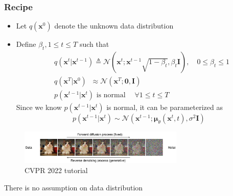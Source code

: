 \documentclass[10pt,xcolor={usenames,dvipsnames,table}]{beamer}
\begin{document}
\begin{frame}
    \frametitle{Recipe}
    \begin{itemize}
        \item Let $q(\bm{x}^{0})$ denote the unknown data distribution
        \item Define $\beta_t, 1\leq t \leq T$ such that
            \begin{align}
                &q(\bm{x}^{t}|\bm{x}^{t-1}) \triangleq \mathcal{N}(\bm{x}^{t}; \bm{x}^{t-1}\sqrt{1-\beta_t}, \beta_t \bm{I}), \quad 0\leq \beta_t \leq 1 \\
                &q(\bm{x}^{T} | \bm{x}^{0}) \; \; \approx \mathcal{N}(\bm{x}^{T}; \bm{0}, \bm{I})  \\
                &p(\bm{x}^{t-1}| \bm{x}^{t}) \text{ is normal} \quad \; \forall 1\leq t \leq T
            \end{align} 
            Since we know $p(\bm{x}^{t-1}|\bm{x}^{t})$ is normal, it can be parameterized as
            \[
            p(\bm{x}^{t-1}| \bm{x}^{t}) \sim \mathcal{N}(\bm{x}^{t-1}; \boldsymbol \mu_{\theta}(\bm{x}^{t}, t), \sigma^2 \bm{I})
            \] 
    \end{itemize}
    \begin{figure}
        \centering
        \includegraphics[width=0.7\textwidth]{images/bidirection.png}
        \caption{CVPR 2022 tutorial}
    \end{figure}
    {\red There is no assumption on data distribution}
\end{frame}
\end{document}
